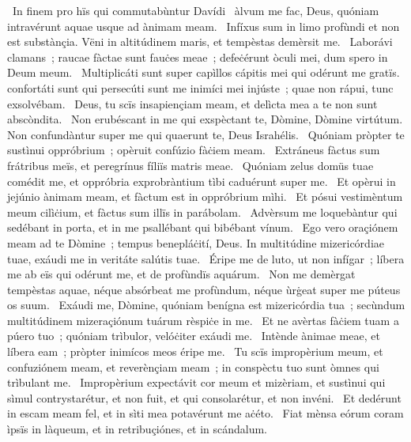 {~In finem pro hïs qui commutabùntur Davídi}
{%
~àlvum me fac, Deus, quóniam intravérunt aquae usque ad ànimam meam. 
~Infíxus sum in limo profùndi et non est substànçia. Vëni in altitúdinem maris, et tempèstas demèrsit me. 
~Laborávi clamans~; raucae fàctae sunt fauċes meae~; defeċérunt òculi mei, dum spero in Deum meum. 
~Multiplicáti sunt super capìllos cápitis mei qui odérunt me gratïs. confortáti sunt qui persecúti sunt me inimíci mei injúste~; quae non rápui, tunc exsolvébam. 
~Deus, tu scïs insapiençiam meam, et delìcta mea a te non sunt abscòndita. 
~Non erubéscant in me qui exspèctant te, Dòmine, Dòmine virtútum. Non confundàntur super me qui quaerunt te, Deus Israhélis. 
~Quóniam pròpter te sustìnui oppróbrium~; opèruit confúzio fàċiem meam. 
~Extráneus fàctus sum frátribus meïs, et peregrínus fíliïs matris meae. 
~Quóniam zelus domüs tuae comédit me, et oppróbria exprobràntium tìbi caduérunt super me. 
~Et opèrui in jejúnio ànimam meam, et fàctum est in oppróbrium mìhi. 
~Et pósui vestimèntum meum cilìċium, et fàctus sum illïs in parábolam. 
~Advèrsum me loquebàntur qui sedébant in porta, et in me psallébant qui bibébant vínum. 
~Ego vero oraçiónem meam ad te Dòmine~; tempus benepláċití, Deus. In multitúdine mizericórdiae tuae, exáudi me in veritáte salútis tuae. 
~Éripe me de luto, ut non infígar~; líbera me ab eïs qui odérunt me, et de profùndïs aquárum. 
~Non me demèrgat tempèstas aquae, néque absórbeat me profùndum, néque ùrġeat super me púteus os suum. 
~Exáudi me, Dòmine, quóniam benígna est mizericórdia tua~; secùndum multitúdinem mizeraçiónum tuárum rèspiċe in me. 
~Et ne avèrtas fàċiem tuam a púero tuo~; quóniam trìbulor, velóċiter exáudi me. 
~Intènde ànimae meae, et líbera eam~; pròpter inimícos meos éripe me. 
~Tu scïs impropèrium meum, et confuziónem meam, et reverènçiam meam~; in conspèctu tuo sunt òmnes qui trìbulant me. 
~Impropèrium expectávit cor meum et mizèriam, et sustìnui qui sìmul contrystarétur, et non fuit, et qui consolarétur, et non invéni. 
~Et dedérunt in escam meam fel, et in sìti mea potavérunt me aċéto. 
~Fiat mènsa eórum coram ìpsïs in làqueum, et in retribuçiónes, et in scándalum. 
}
